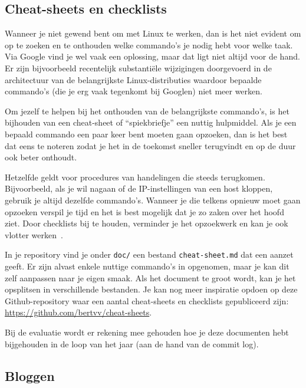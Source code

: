
\subsection{Cheat-sheets en checklists}
\label{cheat-sheets-en-checklists}

Wanneer je niet gewend bent om met Linux te werken, dan is het niet evident om op te zoeken en te onthouden welke commando's je nodig hebt voor welke taak. Via Google vind je wel vaak een oplossing, maar dat ligt niet altijd voor de hand. Er zijn bijvoorbeeld recentelijk substantiële wijzigingen doorgevoerd in de architectuur van de belangrijkste Linux-distributies waardoor bepaalde commando's (die je erg vaak tegenkomt bij Googlen) niet meer werken.

Om jezelf te helpen bij het onthouden van de belangrijkste commando's, is het bijhouden van een cheat-sheet of ``spiekbriefje'' een nuttig hulpmiddel. Als je een bepaald commando een paar keer bent moeten gaan opzoeken, dan is het best dat eens te noteren zodat je het in de toekomst sneller terugvindt en op de duur ook beter onthoudt.

Hetzelfde geldt voor procedures van handelingen die steeds terugkomen.  Bijvoorbeeld, als je wil nagaan of de IP-instellingen van een host kloppen, gebruik je altijd dezelfde commando's. Wanneer je die telkens opnieuw moet gaan opzoeken verspil je tijd en het is best mogelijk dat je zo zaken over het hoofd ziet. Door checklists bij te houden, verminder je het opzoekwerk en kan je ook vlotter werken~\autocite{Simmons2009}.

In je repository vind je onder \texttt{doc/} een bestand \texttt{cheat-sheet.md} dat een aanzet geeft. Er zijn alvast enkele nuttige commando's in opgenomen, maar je kan dit zelf aanpassen naar je eigen smaak. Als het document te groot wordt, kan je het opsplitsen in verschillende bestanden. Je kan nog meer inspiratie opdoen op deze Github-repository waar een aantal cheat-sheets en checklists gepubliceerd zijn: \url{https://github.com/bertvv/cheat-sheets}.

Bij de evaluatie wordt er rekening mee gehouden hoe je deze documenten hebt bijgehouden in de loop van het jaar (aan de hand van de commit log).

\subsection{Bloggen}
\label{bloggen}

